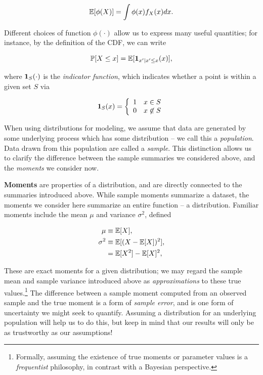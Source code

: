 \documentclass[../primer.tex]{subfiles}
\begin{document}
\begin{equation} \label{eq:ch3-def-expectation}
  \mathbb{E}[\phi(X)] = \int \phi(x) f_X(x) dx.
\end{equation}

\noindent Different choices of function $\phi(\cdot)$ allow us to express many
useful quantities; for instance, by the definition of the CDF, we can write

\begin{equation}
  \P[X \leq x] = \E[\i1_{x' | x' \leq x}(x)],
\end{equation}

\noindent where $\i1_{S}(\cdot)$ is the \emph{indicator function}, which
indicates whether a point is within a given set $S$ via

\begin{equation}
  \i1_{S}(x) = \left\{\begin{array}{ll} %
    1 & x \in S \\
    0 & x \not\in S
  \end{array}\right.
\end{equation}

When using distributions for modeling, we assume that data are generated by some
underlying process which has some distribution -- we call this a
\emph{population}. Data drawn from this population are called a \emph{sample}.
This distinction allows us to clarify the difference between the sample
summaries we considered above, and the \emph{moments} we consider now.

\noindent\textbf{Moments} are properties of a distribution, and are directly
connected to the summaries introduced above. While sample moments summarize a
dataset, the moments we consider here summarize an entire function -- a
distribution. Familiar moments include the mean $\mu$ and variance $\sigma^2$,
defined

\begin{equation} \begin{aligned} \label{eq:ch3-common-moments}
    \mu      &\equiv \mathbb{E}[X], \\
    \sigma^2 &\equiv \mathbb{E}[(X-\mathbb{E}[X])^2], \\
             &= \mathbb{E}[X^2] - \mathbb{E}[X]^2,
\end{aligned} \end{equation}

\noindent These are exact moments for a given distribution; we may regard the
sample mean and sample variance introduced above as \emph{approximations} to
these true values.\footnote{Formally, assuming the existence of true moments or
  parameter values is a \emph{frequentist} philosophy, in contrast with a
  Bayesian perspective.} The difference between a sample moment computed from an
observed sample and the true moment is a form of \emph{sample error}, and is one
form of uncertainty we might seek to quantify. Assuming a distribution for an
underlying population will help us to do this, but keep in mind that our results
will only be as trustworthy as our assumptions!
\end{document}
